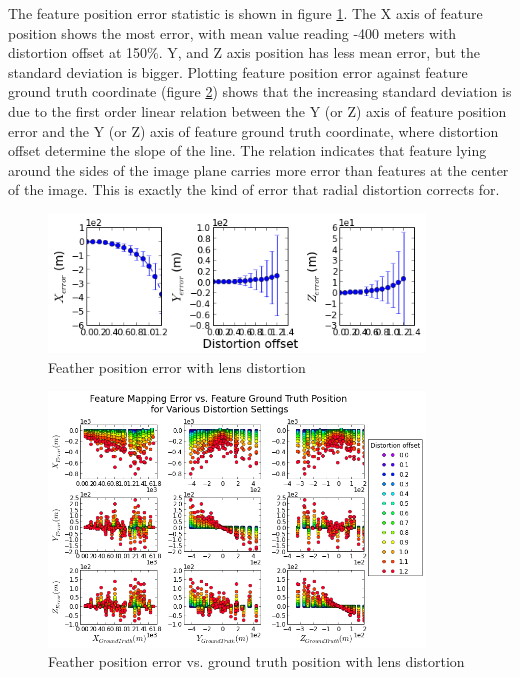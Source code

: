 The feature position error statistic is shown in figure \ref{fig:simfig45}. The X axis of feature position shows the most error, with mean value reading -400 meters with distortion offset at 150\%. Y, and Z axis position has less mean error, but the standard deviation is bigger. Plotting feature position error against feature ground truth coordinate (figure \ref{fig:simfig46}) shows that the increasing standard deviation is due to the first order linear relation between the Y (or Z) axis of feature position error and the Y (or Z) axis of feature ground truth coordinate, where distortion offset determine the slope of the line. The relation indicates that feature lying around the sides of the image plane carries more error than features at the center of the image. This is exactly the kind of error that radial distortion corrects for. 

\begin{figure}[h]
  \centering
  \includegraphics[width=10cm,keepaspectratio=true]{./Figures/SimulationFigures/Figure45.png}
  \caption{Feather position error with lens distortion}
  \label{fig:simfig45}
\end{figure}

\begin{figure}[h]
  \centering
  \includegraphics[width=10cm,keepaspectratio=true]{./Figures/SimulationFigures/Figure46.png}
  \caption{Feather position error vs. ground truth position with lens distortion}
  \label{fig:simfig46}
\end{figure}

